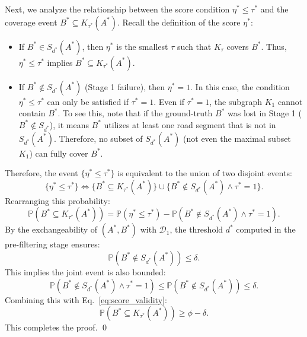 Next, we analyze the relationship between the score condition $\eta^* \le \tau^*$ and the coverage event $B^* \subseteq K_{\tau^*}(A^*)$. Recall the definition of the score $\eta^*$:
\begin{itemize}
    \item If $B^* \in S_{d^*}(A^*)$, then $\eta^*$ is the smallest $\tau$ such that $K_\tau$ covers $B^*$. Thus, $\eta^* \le \tau^*$ implies $B^* \subseteq K_{\tau^*}(A^*)$.
    \item If $B^* \notin S_{d^*}(A^*)$ (Stage 1 failure), then $\eta^* = 1$. In this case, the condition $\eta^* \le \tau^*$ can only be satisfied if $\tau^* = 1$. Even if $\tau^*=1$, the subgraph $K_1$ cannot contain $B^*$. To see this, note that if the ground-truth $B^*$ was lost in Stage 1 ($B^* \notin S_{d^*}$), it means $B^*$ utilizes at least one road segment that is not in $S_{d^*}(A^*)$. Therefore, no subset of $S_{d^*}(A^*)$ (not even the maximal subset $K_1$) can fully cover $B^*$.
\end{itemize}
Therefore, the event $\{\eta^* \le \tau^*\}$ is equivalent to the union of two disjoint events:
\[ \{\eta^* \le \tau^*\} \iff \{B^* \subseteq K_{\tau^*}(A^*)\} \cup \{B^* \notin S_{d^*}(A^*) \land \tau^* = 1\}. \]
Rearranging this probability:
\[ \mathbb{P}(B^* \subseteq K_{\tau^*}(A^*)) = \mathbb{P}(\eta^* \le \tau^*) - \mathbb{P}(B^* \notin S_{d^*}(A^*) \land \tau^* = 1). \]
By the exchangeability of $(A^*, B^*)$ with $\mathcal{D}_1$, the threshold $d^*$ computed in the pre-filtering stage ensures:
\[ \mathbb{P}(B^* \notin S_{d^*}(A^*)) \le \delta. \]
This implies the joint event is also bounded:
\[ \mathbb{P}(B^* \notin S_{d^*}(A^*) \land \tau^* = 1) \le \mathbb{P}(B^* \notin S_{d^*}(A^*)) \le \delta. \]
Combining this with Eq.~\eqref{eq:score_validity}:
\[ \mathbb{P}(B^* \subseteq K_{\tau^*}(A^*)) \ge \phi - \delta. \]
This completes the proof. \qed